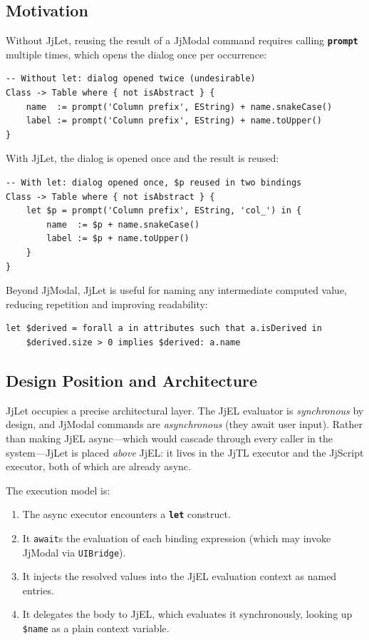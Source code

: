 \documentclass[11pt,a4paper]{article}
\newcommand{\jjmodal}{\textsf{JjModal}}
\newcommand{\jjlet}{\textsf{JjLet}}
\newcommand{\jjel}{\textsf{JjEL}}
\newcommand{\jjtl}{\textsf{JjTL}}
\newcommand{\kw}[1]{\texttt{\textbf{#1}}}
\begin{document}
\subsection{Motivation}

Without \jjlet{}, reusing the result of a \jjmodal{} command requires
calling \kw{prompt} multiple times, which opens the dialog once per
occurrence:

\begin{lstlisting}[style=jjtl,numbers=none]
-- Without let: dialog opened twice (undesirable)
Class -> Table where { not isAbstract } {
    name  := prompt('Column prefix', EString) + name.snakeCase()
    label := prompt('Column prefix', EString) + name.toUpper()
}
\end{lstlisting}

With \jjlet{}, the dialog is opened once and the result is reused:

\begin{lstlisting}[style=jjtl,numbers=none]
-- With let: dialog opened once, $p reused in two bindings
Class -> Table where { not isAbstract } {
    let $p = prompt('Column prefix', EString, 'col_') in {
        name  := $p + name.snakeCase()
        label := $p + name.toUpper()
    }
}
\end{lstlisting}

Beyond \jjmodal{}, \jjlet{} is useful for naming any intermediate
computed value, reducing repetition and improving readability:

\begin{lstlisting}[style=jjtl,numbers=none]
let $derived = forall a in attributes such that a.isDerived in
    $derived.size > 0 implies $derived: a.name
\end{lstlisting}


\subsection{Design Position and Architecture}

\jjlet{} occupies a precise architectural layer. The \jjel{} evaluator
is \emph{synchronous} by design, and \jjmodal{} commands are
\emph{asynchronous} (they await user input). Rather than making \jjel{}
async---which would cascade through every caller in the system---\jjlet{}
is placed \emph{above} \jjel{}: it lives in the \jjtl{} executor and
the \textsf{JjScript} executor, both of which are already async.

The execution model is:
\begin{enumerate}
    \item The async executor encounters a \kw{let} construct.
    \item It \texttt{await}s the evaluation of each binding expression
          (which may invoke \jjmodal{} via \texttt{UIBridge}).
    \item It injects the resolved values into the \jjel{} evaluation
          context as named entries.
    \item It delegates the body to \jjel{}, which evaluates it
          synchronously, looking up \texttt{\$name} as a plain
          context variable.
\end{enumerate}
\end{document}
